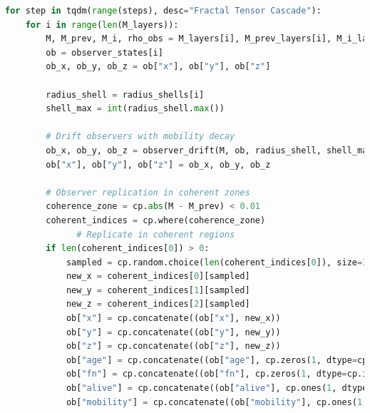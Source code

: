 \begin{lstlisting}[language=Python]
for step in tqdm(range(steps), desc="Fractal Tensor Cascade"):
    for i in range(len(M_layers)):
        M, M_prev, M_i, rho_obs = M_layers[i], M_prev_layers[i], M_i_layers[i], rho_obs_layers[i]
        ob = observer_states[i]
        ob_x, ob_y, ob_z = ob["x"], ob["y"], ob["z"]

        radius_shell = radius_shells[i]
        shell_max = int(radius_shell.max())

        # Drift observers with mobility decay
        ob_x, ob_y, ob_z = observer_drift(M, ob, radius_shell, shell_max)
        ob["x"], ob["y"], ob["z"] = ob_x, ob_y, ob_z

        # Observer replication in coherent zones
        coherence_zone = cp.abs(M - M_prev) < 0.01
        coherent_indices = cp.where(coherence_zone)
              # Replicate in coherent regions
        if len(coherent_indices[0]) > 0:
            sampled = cp.random.choice(len(coherent_indices[0]), size=1)
            new_x = coherent_indices[0][sampled]
            new_y = coherent_indices[1][sampled]
            new_z = coherent_indices[2][sampled]
            ob["x"] = cp.concatenate((ob["x"], new_x))
            ob["y"] = cp.concatenate((ob["y"], new_y))
            ob["z"] = cp.concatenate((ob["z"], new_z))
            ob["age"] = cp.concatenate((ob["age"], cp.zeros(1, dtype=cp.int32)))
            ob["fn"] = cp.concatenate((ob["fn"], cp.zeros(1, dtype=cp.int32)))
            ob["alive"] = cp.concatenate((ob["alive"], cp.ones(1, dtype=cp.bool_)))
            ob["mobility"] = cp.concatenate((ob["mobility"], cp.ones(1, dtype=cp.float32)))


\end{lstlisting}
